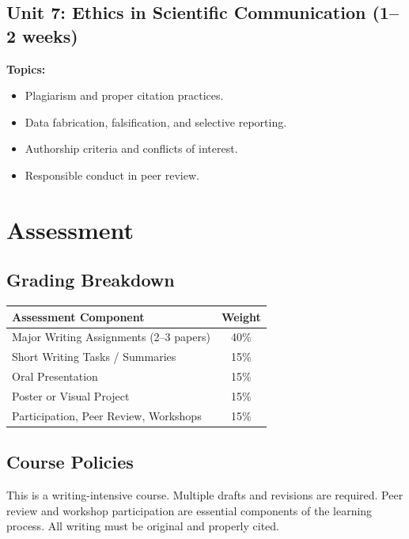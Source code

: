 \documentclass[12pt,oneside]{book}
\begin{document}
\subsection{Unit 7: Ethics in Scientific Communication (1--2 weeks)}

\textbf{Topics:}
\begin{itemize}
    \item Plagiarism and proper citation practices.
    \item Data fabrication, falsification, and selective reporting.
    \item Authorship criteria and conflicts of interest.
    \item Responsible conduct in peer review.
\end{itemize}

\section{Assessment}

\subsection{Grading Breakdown}

\begin{table}[h]
\centering
\begin{tabular}{lc}
\toprule
\textbf{Assessment Component} & \textbf{Weight} \\
\midrule
Major Writing Assignments (2–3 papers) & 40\% \\
Short Writing Tasks / Summaries & 15\% \\
Oral Presentation & 15\% \\
Poster or Visual Project & 15\% \\
Participation, Peer Review, Workshops & 15\% \\
\bottomrule
\end{tabular}
\end{table}

\subsection{Course Policies}

This is a writing-intensive course. Multiple drafts and revisions are required. Peer review and workshop participation are essential components of the learning process. All writing must be original and properly cited.

\end{document}
